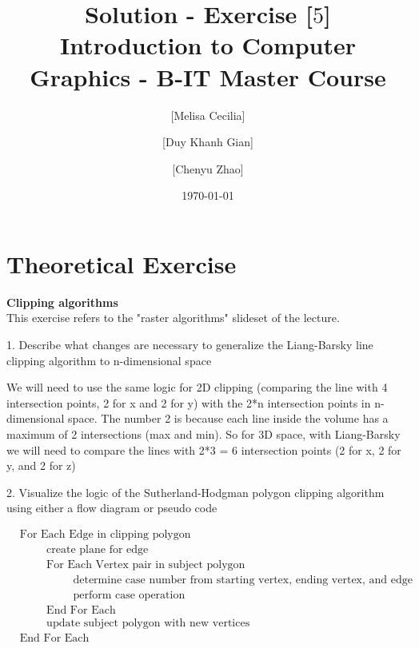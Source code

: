 \documentclass[10pt,a4paper]{article}
\begin{document}
\title{Solution - Exercise [$5$]\\
\small{Introduction to Computer Graphics - B-IT Master Course}}
\author{ [Melisa Cecilia] \and [Duy Khanh Gian] \and [Chenyu Zhao]}
\date{\today}
\maketitle

\section*{Theoretical Exercise}
{\bf Clipping algorithms } \\

This exercise refers to the "raster algorithms" slideset of the lecture. \\

\begin{flushleft}
1. Describe what changes are necessary to generalize the Liang-Barsky line clipping algorithm to n-dimensional space
\end{flushleft}

 We will need to use the same logic for 2D clipping (comparing the line with 4 intersection points, 2 for x and 2 for y) with the 2*n intersection points in n-dimensional space. The number 2 is because each line inside the volume has a maximum of 2 intersections (max and min). So for 3D space, with Liang-Barsky we will need to compare the lines with 2*3 = 6 intersection points (2 for x, 2 for y, and 2 for z) \\
 
\begin{flushleft}
2. Visualize the logic of the Sutherland-Hodgman polygon clipping algorithm using either a flow diagram or pseudo code
\end{flushleft}

\begin{align*}
  &\text{For Each Edge in clipping polygon} \\
  & \hspace{1cm} \text{create plane for edge} \\
  & \hspace{1cm} \text{For Each Vertex pair in subject polygon} \\
  	& \hspace{2cm} \text{determine case number from starting vertex, ending vertex, and edge} \\
	& \hspace{2cm} \text{perform case operation} \\
  & \hspace{1cm} \text{End For Each} \\
  & \hspace{1cm} \text{update subject polygon with new vertices} \\
  &\text{End For Each}
\end{align*}
\end{document}
